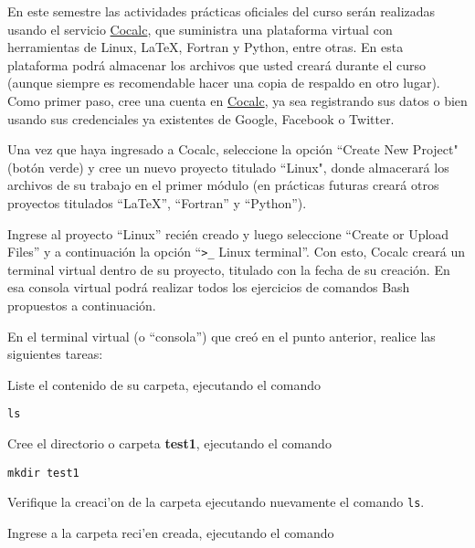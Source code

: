 \documentclass[11pt]{exam}
\begin{document}
\begin{questions}

\item En este semestre las actividades prácticas oficiales del curso serán realizadas usando el servicio \href{https://cocalc.com}{Cocalc}, que suministra una plataforma virtual con herramientas de Linux, \LaTeX, Fortran y Python, entre otras. En esta plataforma podrá almacenar los archivos que usted creará durante el curso (aunque siempre es recomendable hacer una copia de respaldo en otro lugar). Como primer paso, cree una cuenta en \href{https://cocalc.com}{Cocalc}, ya sea registrando sus datos o bien usando sus credenciales ya existentes de Google, Facebook o Twitter.

\item Una vez que haya ingresado a Cocalc, seleccione la opción ``Create New Project" (botón verde) y cree un nuevo proyecto titulado ``Linux", donde almacerará los archivos de su trabajo en el primer módulo (en prácticas futuras creará otros proyectos titulados ``LaTeX'', ``Fortran'' y ``Python'').

\item Ingrese al proyecto ``Linux'' recién creado y luego seleccione ``Create or Upload Files'' y a continuación la opción ``\verb!>_! Linux terminal''. Con esto, Cocalc creará un terminal virtual dentro de su proyecto, titulado con la fecha de su creación. En esa consola virtual podrá realizar todos los ejercicios de comandos Bash propuestos a continuación.

\item En el terminal virtual (o ``consola'') que creó en el punto anterior, realice las siguientes tareas:
\begin{parts}
\item Liste el contenido de su carpeta, ejecutando el comando 

\begin{verbatim}
ls
\end{verbatim}

\item Cree el directorio o carpeta \textbf{test1}, ejecutando el comando 

\begin{verbatim}
mkdir test1
\end{verbatim}

Verifique la creaci'on de la carpeta ejecutando nuevamente el comando \texttt{ls}.

\item Ingrese a la carpeta reci'en creada, ejecutando el comando 


\end{parts}
\end{questions}
\end{document}
